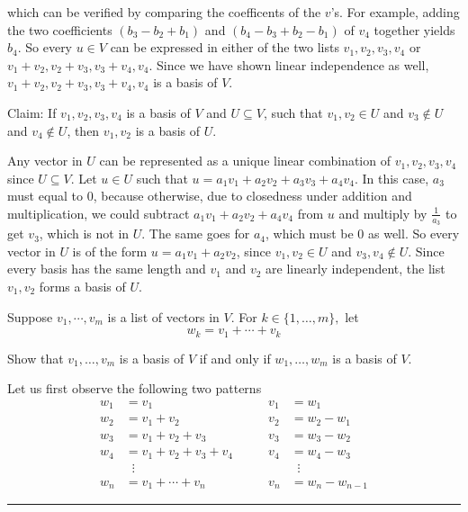 \begin{xrcs}
\begin{xprf}
    which can be verified by comparing the coefficents of the $v$'s. For example, adding the two coefficients $(b_3 - b_2+b_1)$ and $(b_4-b_3+b_2-b_1)$ of $v_4$ together yields $b_4$. So every $u \in V$ can be expressed in either of the two lists $v_1, v_2, v_3, v_4$ or $v_1 + v_2, v_2 + v_3, v_3+v_4, v_4$. Since we have shown linear independence as well, $v_1 + v_2, v_2 + v_3, v_3+v_4, v_4$ is a basis of $V$.
  \end{xprf}
\end{xrcs}

\begin{xrcs}
  Claim: If $v_1, v_2, v_3, v_4$ is a basis of $V$ and $U \subseteq V$, such that $v_1, v_2 \in U$ and $v_3 \notin U$ and $v_4 \notin U$, then $v_1, v_2$ is a basis of $U$.

  \begin{xprf}
    Any vector in $U$ can be represented as a unique linear combination of $v_1, v_2, v_3, v_4$ since $U \subseteq V$. Let $u\in U$ such that $u=a_1 v_1 + a_2 v_2 + a_3 v_3 + a_4 v_4$. In this case, $a_3$ must equal to $0$, because otherwise, due to closedness under addition and multiplication, we could subtract $a_1 v_1 + a_2 v_2+a_4v_4$ from $u$ and multiply by $\frac{1}{a_3}$ to get $v_3$, which is not in $U$. The same goes for $a_4$, which must be $0$ as well. So every vector in $U$ is of the form $u=a_1 v_1 + a_2 v_2$, since $v_1, v_2 \in U$ and $v_3, v_4 \notin U$. Since every basis has the same length and $v_1$ and $v_2$ are linearly independent, the list $v_1, v_2$ forms a basis of $U$.
  \end{xprf}
\end{xrcs}


\begin{xrcs}
  Suppose $v_1, \cdots, v_m$ is a list of vectors in $V$. For $k \in \{1, \ldots, m\},$ let
  \begin{equation}
    w_k = v_1 + \cdots + v_k
  \end{equation}

  Show that $v_1, \ldots, v_m$ is a basis of $V$ if and only if $w_1, \ldots, w_m$ is a basis of $V$.

  \begin{xprf}
    Let us first observe the following two patterns
    \begin{equation}
      \begin{aligned}
        w_1 &= v_1                    & \qquad v_1 &= w_1       \\
        w_2 &= v_1 + v_2              & \qquad v_2 &= w_2 - w_1 \\
        w_3 &= v_1 + v_2 + v_3        & \qquad v_3 &= w_3 - w_2 \\
        w_4 &= v_1 + v_2 + v_3 + v_4  & \qquad v_4 &= w_4 - w_3 \\
        &\;\;\vdots               &            &\;\;\vdots \\
        w_n &= v_1 + \cdots + v_n     & \qquad v_n &= w_n - w_{n-1}
      \end{aligned}
    \end{equation}
  \end{xprf}
\end{xrcs}


\phantom{.}

\hrule
